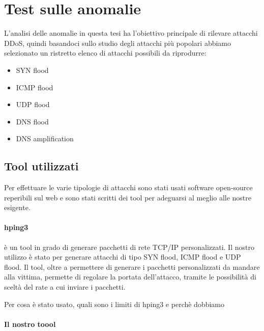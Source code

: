 \section{Test sulle anomalie}

L'analisi delle anomalie in questa tesi ha l'obiettivo principale di rilevare attacchi DDoS, quindi basandoci sullo studio degli attacchi più popolari abbiamo selezionato un ristretto elenco di attacchi possibili da riprodurre:
\begin{itemize}
    \item SYN flood
    \item ICMP flood
    \item UDP flood
    \item DNS flood
    \item DNS amplification
\end{itemize}

\subsection{Tool utilizzati}

Per effettuare le varie tipologie di attacchi sono stati usati software open-source reperibili sul web e sono stati scritti dei tool per adeguarsi al meglio alle nostre esigente.

\paragraph{hping3} è un tool in grado di generare pacchetti di rete TCP/IP personalizzati. Il nostro utilizzo è stato per generare attacchi di tipo SYN flood, ICMP flood e UDP flood. Il tool, oltre a permettere di generare i pacchetti personalizzati da mandare alla vittima, permette di regolare la portata dell'attacco, tramite le possibilità di sceltà del rate a cui inviare i pacchetti.


Per cosa è stato usato, quali sono i limiti di hping3 e perchè dobbiamo

\paragraph{Il nostro toool}

